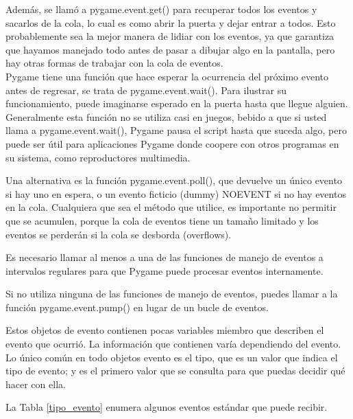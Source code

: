 Además, se llamó a {\ttfamily pygame.event.get()} para recuperar todos los eventos y sacarlos de la cola, lo cual es
como abrir la puerta y dejar entrar a todos.  Esto probablemente sea la mejor manera de lidiar con los eventos, ya que garantiza que hayamos manejado  todo antes de pasar a dibujar algo en la pantalla, pero hay otras formas de trabajar con la cola de eventos. \\

Pygame tiene una función que hace esperar la ocurrencia del próximo evento antes de regresar, se trata de 
{\ttfamily pygame.event.wait()}. Para ilustrar su funcionamiento, puede imaginarse esperado en la puerta hasta 
que llegue alguien. Generalmente esta función no se utiliza casi en juegos, bebido a que si usted llama a 
{\ttfamily pygame.event.wait()}, Pygame pausa el {\ttfamily script} hasta que suceda algo, pero puede ser útil para
 aplicaciones Pygame donde coopere con otros programas en su sistema, como reproductores multimedia.


Una alternativa es la función  {\ttfamily pygame.event.poll()}, que devuelve un  único evento si hay uno en espera, 
o un evento ficticio (dummy)  {\ttfamily NOEVENT} si no hay eventos en la cola. Cualquiera que sea el método que utilice,
es importante no permitir que se acumulen, porque la cola de eventos tiene un tamaño limitado y los eventos se perderán
si la cola se desborda (overflows).

Es necesario llamar al menos a una de las funciones de manejo de eventos a intervalos regulares para que Pygame puede procesar eventos internamente. 

Si no utiliza ninguna de las funciones de manejo de eventos, puedes llamar a la función  {\ttfamily pygame.event.pump()} 
en lugar de un bucle de eventos. 

Estos objetos de evento contienen pocas variables miembro que describen el evento que ocurrió. La información que contienen
varía dependiendo del evento. Lo único común en todo  objetos evento es el tipo, que es un valor que indica el tipo de evento; y es el primero valor que se consulta para que puedas decidir qué hacer con ella. 

La Tabla \ref{tipo_evento} enumera  algunos eventos estándar que puede recibir.\\

